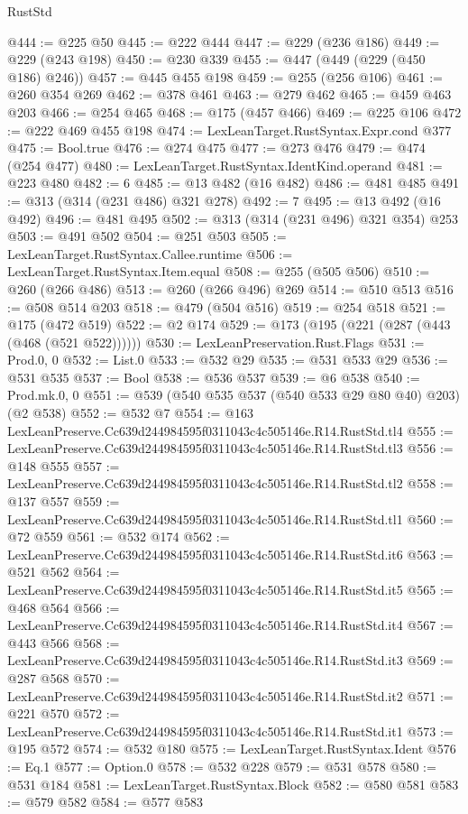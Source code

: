 \begin{lexlean}{RustStd}
\begin{coremodule}
@444 := @225 @50
@445 := @222 @444
@447 := @229 (@236 @186)
@449 := @229 (@243 @198)
@450 := @230 @339
@455 := @447 (@449 (@229 (@450 @186) @246))
@457 := @445 @455 @198
@459 := @255 (@256 @106)
@461 := @260 @354 @269
@462 := @378 @461
@463 := @279 @462
@465 := @459 @463 @203
@466 := @254 @465
@468 := @175 (@457 @466)
@469 := @225 @106
@472 := @222 @469 @455 @198
@474 := LexLeanTarget.RustSyntax.Expr.cond @377
@475 := Bool.true
@476 := @274 @475
@477 := @273 @476
@479 := @474 (@254 @477)
@480 := LexLeanTarget.RustSyntax.IdentKind.operand
@481 := @223 @480
@482 := 6
@485 := @13 @482 (@16 @482)
@486 := @481 @485
@491 := @313 (@314 (@231 @486) @321 @278)
@492 := 7
@495 := @13 @492 (@16 @492)
@496 := @481 @495
@502 := @313 (@314 (@231 @496) @321 @354) @253
@503 := @491 @502
@504 := @251 @503
@505 := LexLeanTarget.RustSyntax.Callee.runtime
@506 := LexLeanTarget.RustSyntax.Item.equal
@508 := @255 (@505 @506)
@510 := @260 (@266 @486)
@513 := @260 (@266 @496) @269
@514 := @510 @513
@516 := @508 @514 @203
@518 := @479 (@504 @516)
@519 := @254 @518
@521 := @175 (@472 @519)
@522 := @2 @174
@529 := @173 (@195 (@221 (@287 (@443 (@468 (@521 @522))))))
@530 := LexLeanPreservation.Rust.Flags
@531 := Prod.{0, 0}
@532 := List.{0}
@533 := @532 @29
@535 := @531 @533 @29
@536 := @531 @535
@537 := Bool
@538 := @536 @537
@539 := @6 @538
@540 := Prod.mk.{0, 0}
@551 := @539 (@540 @535 @537 (@540 @533 @29 @80 @40) @203) (@2 @538)
@552 := @532 @7
@554 := @163 LexLeanPreserve.Cc639d244984595f0311043c4c505146e.R14.RustStd.tl4
@555 := LexLeanPreserve.Cc639d244984595f0311043c4c505146e.R14.RustStd.tl3
@556 := @148 @555
@557 := LexLeanPreserve.Cc639d244984595f0311043c4c505146e.R14.RustStd.tl2
@558 := @137 @557
@559 := LexLeanPreserve.Cc639d244984595f0311043c4c505146e.R14.RustStd.tl1
@560 := @72 @559
@561 := @532 @174
@562 := LexLeanPreserve.Cc639d244984595f0311043c4c505146e.R14.RustStd.it6
@563 := @521 @562
@564 := LexLeanPreserve.Cc639d244984595f0311043c4c505146e.R14.RustStd.it5
@565 := @468 @564
@566 := LexLeanPreserve.Cc639d244984595f0311043c4c505146e.R14.RustStd.it4
@567 := @443 @566
@568 := LexLeanPreserve.Cc639d244984595f0311043c4c505146e.R14.RustStd.it3
@569 := @287 @568
@570 := LexLeanPreserve.Cc639d244984595f0311043c4c505146e.R14.RustStd.it2
@571 := @221 @570
@572 := LexLeanPreserve.Cc639d244984595f0311043c4c505146e.R14.RustStd.it1
@573 := @195 @572
@574 := @532 @180
@575 := LexLeanTarget.RustSyntax.Ident
@576 := Eq.{1}
@577 := Option.{0}
@578 := @532 @228
@579 := @531 @578
@580 := @531 @184
@581 := LexLeanTarget.RustSyntax.Block
@582 := @580 @581
@583 := @579 @582
@584 := @577 @583

\end{coremodule}
\end{lexlean}
